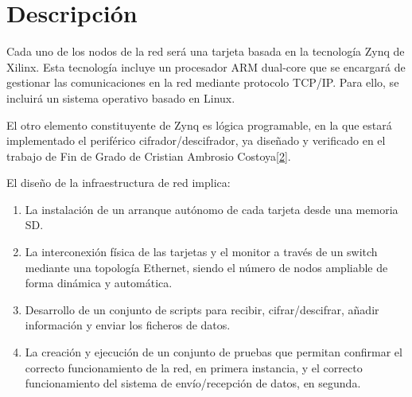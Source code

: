 \section{Descripción}
Cada uno de los nodos de la red será una tarjeta basada en la tecnología Zynq de Xilinx. Esta tecnología incluye un procesador ARM dual-core que se encargará de gestionar las
comunicaciones en la red mediante protocolo TCP/IP. Para ello, se incluirá un sistema operativo basado en Linux.

El otro elemento constituyente de Zynq es lógica programable, en la que estará implementado el periférico cifrador/descifrador, ya diseñado y verificado en el trabajo de Fin de Grado de Cristian Ambrosio Costoya\hyperlink{2}{[2]}.

El diseño de la infraestructura de red implica:
\begin{enumerate}
	\item La instalación de un arranque autónomo de cada tarjeta desde una memoria SD.
	\item La interconexión física de las tarjetas y el monitor a través de
	un switch mediante una topología Ethernet, siendo el número de nodos ampliable de forma dinámica y automática.
	\item Desarrollo de un conjunto de scripts para recibir, cifrar/descifrar, añadir información y enviar los ficheros de datos.
	\item La creación y ejecución de un conjunto de pruebas que permitan confirmar
	el correcto funcionamiento de la red, en primera instancia, y el correcto funcionamiento del sistema de envío/recepción de datos, en segunda.
\end{enumerate}